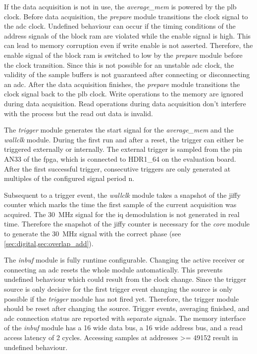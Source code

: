 \documentclass[12pt,a4paper,parskip=full,abstract=true,BCOR=12mm,twoside,open=right]{scrreprt}
\def\device#1{\textit{#1}}
\begin{document}
If the data acquisition is not in use, the \device{average\_mem} is powered by
the \gls{plb} clock. Before data acquisition, the \device{prepare} module
transitions the clock signal to the \gls{adc} clock. Undefined behaviour can
occur if the timing conditions of the address signals of the block \gls{ram}
are violated while the enable signal is high. This can lead to memory corruption
even if write enable is not asserted\cite{virtex5}. Therefore, the enable signal
of the block \gls{ram} is switched to low by the \device{prepare} module before
the clock transition. Since this is not possible for an unstable \gls{adc} clock,
the validity of the sample buffers is not guaranteed after connecting or
disconnecting an \gls{adc}. After the data acquisition finishes, the
\device{prepare} module transitions the clock signal back to the \gls{plb} clock.
Write operations to the memory are ignored during data acquisition. Read operations
during data acquisition don't interfere with the process but the read out data is invalid.

The \device{trigger} module generates the start signal for the \device{average\_mem}
and the \device{wallclk} module. During the first run and after a reset, the trigger can either be triggered
externally or internally. The external trigger is sampled from the pin AN33 of the
\gls{fpga}, which is connected to HDR1\_64 on the evaluation board. After the first
successful trigger, consecutive triggers are only generated at multiples of the configured signal period \gls{n}.

Subsequent to a trigger event, the \device{wallclk} module takes a snapshot of the
jiffy counter which marks the time the first sample of the current acquisition
was acquired. The \SI{30}{\mega\hertz} signal for the \gls{iq} demodulation
is not generated in real time. Therefore the snapshot of the jiffy counter is necessary
for the \device{core} module to generate the \SI{30}{\mega\hertz} signal with the
correct phase (see \cref{sec:digital,sec:overlap_add}).

The \device{inbuf} module is fully runtime configurable. Changing the active receiver
or connecting an \gls{adc} resets the whole module automatically. This prevents undefined
behaviour which could result from the clock change. Since the trigger source is only
decisive for the first trigger event changing the source is only possible if the \device{trigger}
module has not fired yet. Therefore, the trigger module should be reset after changing
the source. Trigger events, averaging finished, and \gls{adc} connection status are reported
with separate signals. The memory interface of the \device{inbuf} module has a \SI{16}{\bit} wide data bus,
a \SI{16}{\bit} wide address bus, and a read access latency of 2 cycles. Accessing samples
at addresses \num{>= 49152} result in undefined behaviour.
\end{document}
